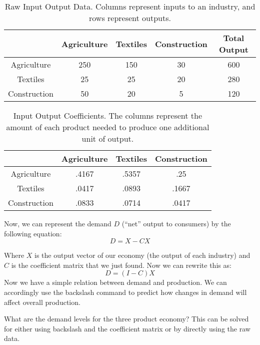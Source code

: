\begin{table}
\begin{center}
\begin{tabular}{|c|c|c|c|c|}
\hline
& Agriculture & Textiles & Construction & Total Output \\ \hline
Agriculture & 250 & 150 & 30 & 600 \\ \hline
Textiles & 25 & 25 & 20 & 280 \\ \hline
Construction & 50 & 20 & 5 & 120 \\ \hline
\end{tabular}
\caption{Raw Input Output Data. Columns represent inputs to an industry, and rows represent outputs.}  \label{IORawTable}
\end{center}
\end{table}

\begin{table}

\begin{center}
\begin{tabular}{|c|c|c|c|} 
\hline
& Agriculture & Textiles & Construction \\ \hline
Agriculture & .4167 & .5357 & .25 \\ \hline
Textiles & .0417 & .0893 & .1667 \\ \hline
Construction & .0833 & .0714 & .0417 \\ \hline
\end{tabular}
\caption{Input Output Coefficients. The columns represent the amount of each product needed to produce one additional unit of output.} \label{IOCoefTable}
\end{center}
\end{table}

Now, we can represent the demand $D$ (``net'' output to consumers) by the following equation:
\[
D = X-CX
\]

Where $X$ is the output vector of our economy (the output of each industry) and $C$ is the coefficient matrix that we just found. Now we can rewrite this as:
\[
D = (I-C)X
\]
Now we have a simple relation between demand and production. We can accordingly use the backslash command to predict how changes in demand will affect overall production.

\begin{problem}
What are the demand levels for the three product economy? This can be solved for either using backslash and the coefficient matrix or by directly using the raw data.
\end{problem}

